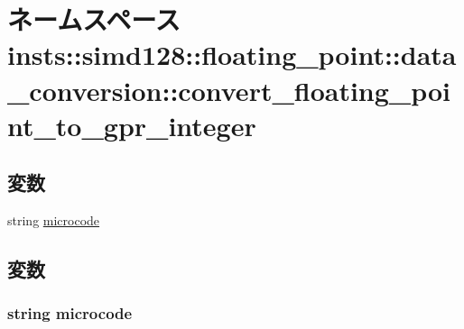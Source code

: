 \hypertarget{namespaceinsts_1_1simd128_1_1floating__point_1_1data__conversion_1_1convert__floating__point__to__gpr__integer}{
\section{ネームスペース insts::simd128::floating\_\-point::data\_\-conversion::convert\_\-floating\_\-point\_\-to\_\-gpr\_\-integer}
\label{namespaceinsts_1_1simd128_1_1floating__point_1_1data__conversion_1_1convert__floating__point__to__gpr__integer}
}
\subsection*{変数}
\begin{DoxyCompactItemize}
\item 
string \hyperlink{namespaceinsts_1_1simd128_1_1floating__point_1_1data__conversion_1_1convert__floating__point__to__gpr__integer_a770f11a173e99389a8802f0107ed8f52}{microcode}
\end{DoxyCompactItemize}


\subsection{変数}
\hypertarget{namespaceinsts_1_1simd128_1_1floating__point_1_1data__conversion_1_1convert__floating__point__to__gpr__integer_a770f11a173e99389a8802f0107ed8f52}{
\subsubsection[{microcode}]{\setlength{\rightskip}{0pt plus 5cm}string {\bf microcode}}}
\label{namespaceinsts_1_1simd128_1_1floating__point_1_1data__conversion_1_1convert__floating__point__to__gpr__integer_a770f11a173e99389a8802f0107ed8f52}
